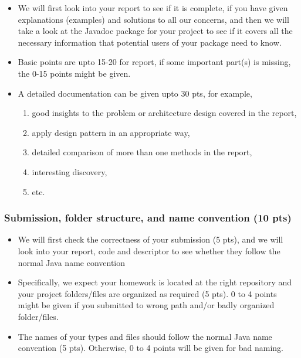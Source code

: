 \begin{itemize}

\item We will first look into your report to see if it is complete, if you have
given explanations (examples) and solutions to all our concerns, and then we will take a look at the Javadoc package for your project to see if it covers all the necessary information that potential users of your package need to know.

\item Basic points are upto 15-20 for report, if some
important part(s) is missing, the 0-15 points might be given.

\item A detailed documentation can be given upto 30 pts, for example,

\begin{enumerate}
\item good insights to the problem or architecture design covered in the report,
\item apply design pattern in an appropriate way,
\item detailed comparison of more than one methods in the report,
\item interesting discovery,
\item etc.
\end{enumerate}

\end{itemize}

\subsubsection{Submission, folder structure, and name convention (10 pts)}

\begin{itemize}

\item We will first check the correctness of your submission (5 pts), 
and we will look into your report, code and descriptor to see whether they follow 
the normal Java name convention 

\item Specifically, we expect your homework is located at the right repository 
and your project folders/files are organized as required (5 pts). 
0 to 4 points might be given if you submitted to wrong path and/or badly organized folder/files. 

\item The names of your types and files should follow the normal Java name convention (5 pts). 
Otherwise, 0 to 4 points will be given for bad naming. 


\end{itemize}
